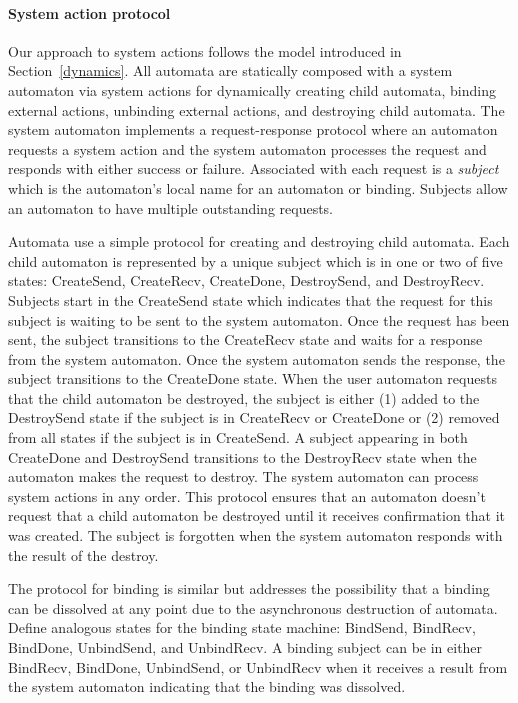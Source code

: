\paragraph*{System action protocol}
Our approach to system actions follows the model introduced in Section~\ref{dynamics}.
All automata are statically composed with a system automaton via system actions for dynamically creating child automata, binding external actions, unbinding external actions, and destroying child automata.
The system automaton implements a request-response protocol where an automaton requests a system action and the system automaton processes the request and responds with either success or failure.
Associated with each request is a \emph{subject} which is the automaton's local name for an automaton or binding.
Subjects allow an automaton to have multiple outstanding requests.

Automata use a simple protocol for creating and destroying child automata.
Each child automaton is represented by a unique subject which is in one or two of five states: CreateSend, CreateRecv, CreateDone, DestroySend, and DestroyRecv.
Subjects start in the CreateSend state which indicates that the request for this subject is waiting to be sent to the system automaton.
Once the request has been sent, the subject transitions to the CreateRecv state and waits for a response from the system automaton.
Once the system automaton sends the response, the subject transitions to the CreateDone state.
When the user automaton requests that the child automaton be destroyed, the subject is either (1) added to the DestroySend state if the subject is in CreateRecv or CreateDone or (2) removed from all states if the subject is in CreateSend.
A subject appearing in both CreateDone and DestroySend transitions to the DestroyRecv state when the automaton makes the request to destroy.
The system automaton can process system actions in any order.
This protocol ensures that an automaton doesn't request that a child automaton be destroyed until it receives confirmation that it was created.
The subject is forgotten when the system automaton responds with the result of the destroy.

The protocol for binding is similar but addresses the possibility that a binding can be dissolved at any point due to the asynchronous destruction of automata.
Define analogous states for the binding state machine: BindSend, BindRecv, BindDone, UnbindSend, and UnbindRecv.
A binding subject can be in either BindRecv, BindDone, UnbindSend, or UnbindRecv when it receives a result from the system automaton indicating that the binding was dissolved.

